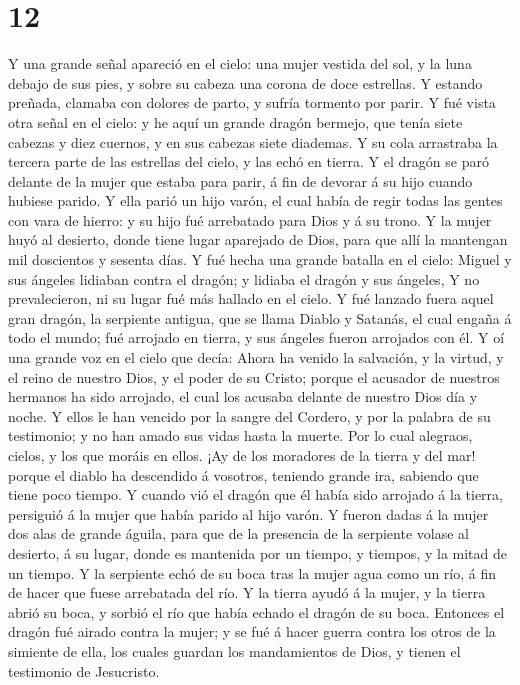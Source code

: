 \hypertarget{section-11}{%
\section{12}\label{section-11}}

 Y una grande señal apareció en el cielo: una mujer vestida
del sol, y la luna debajo de sus pies, y sobre su cabeza una corona de
doce estrellas.  Y estando preñada, clamaba con dolores de
parto, y sufría tormento por parir.  Y fué vista otra señal
en el cielo: y he aquí un grande dragón bermejo, que tenía siete cabezas
y diez cuernos, y en sus cabezas siete diademas.  Y su cola
arrastraba la tercera parte de las estrellas del cielo, y las echó en
tierra. Y el dragón se paró delante de la mujer que estaba para parir, á
fin de devorar á su hijo cuando hubiese parido.  Y ella
parió un hijo varón, el cual había de regir todas las gentes con vara de
hierro: y su hijo fué arrebatado para Dios y á su trono.  Y
la mujer huyó al desierto, donde tiene lugar aparejado de Dios, para que
allí la mantengan mil doscientos y sesenta días.  Y fué
hecha una grande batalla en el cielo: Miguel y sus ángeles lidiaban
contra el dragón; y lidiaba el dragón y sus ángeles,  Y no
prevalecieron, ni su lugar fué más hallado en el cielo.  Y
fué lanzado fuera aquel gran dragón, la serpiente antigua, que se llama
Diablo y Satanás, el cual engaña á todo el mundo; fué arrojado en
tierra, y sus ángeles fueron arrojados con él.  Y oí una
grande voz en el cielo que decía: Ahora ha venido la salvación, y la
virtud, y el reino de nuestro Dios, y el poder de su Cristo; porque el
acusador de nuestros hermanos ha sido arrojado, el cual los acusaba
delante de nuestro Dios día y noche.  Y ellos le han
vencido por la sangre del Cordero, y por la palabra de su testimonio; y
no han amado sus vidas hasta la muerte.  Por lo cual
alegraos, cielos, y los que moráis en ellos. ¡Ay de los moradores de la
tierra y del mar! porque el diablo ha descendido á vosotros, teniendo
grande ira, sabiendo que tiene poco tiempo.  Y cuando vió
el dragón que él había sido arrojado á la tierra, persiguió á la mujer
que había parido al hijo varón.  Y fueron dadas á la mujer
dos alas de grande águila, para que de la presencia de la serpiente
volase al desierto, á su lugar, donde es mantenida por un tiempo, y
tiempos, y la mitad de un tiempo.  Y la serpiente echó de
su boca tras la mujer agua como un río, á fin de hacer que fuese
arrebatada del río.  Y la tierra ayudó á la mujer, y la
tierra abrió su boca, y sorbió el río que había echado el dragón de su
boca.  Entonces el dragón fué airado contra la mujer; y se
fué á hacer guerra contra los otros de la simiente de ella, los cuales
guardan los mandamientos de Dios, y tienen el testimonio de Jesucristo.

